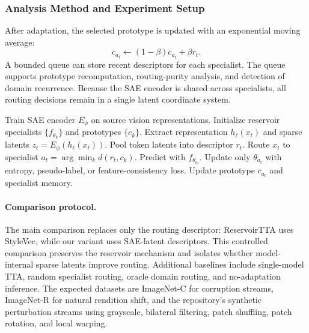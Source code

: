 \documentclass{article}
\begin{document}
\subsubsection{Analysis Method and Experiment Setup}

After adaptation, the selected prototype is updated with an exponential moving average:
\begin{equation}
c_{a_t} \leftarrow (1-\beta)c_{a_t}+\beta r_t.
\end{equation}
A bounded queue can store recent descriptors for each specialist. The queue supports prototype recomputation, routing-purity analysis, and detection of domain recurrence. Because the SAE encoder is shared across specialists, all routing decisions remain in a single latent coordinate system.

\begin{algorithm}[t]
\caption{SAE-Latent Reservoir Routing}
\begin{algorithmic}[1]
\STATE Train SAE encoder $E_\phi$ on source vision representations.
\STATE Initialize reservoir specialists $\{f_{\theta_k}\}$ and prototypes $\{c_k\}$.
    \STATE Extract representation $h_\ell(x_t)$ and sparse latents $z_t=E_\phi(h_\ell(x_t))$.
    \STATE Pool token latents into descriptor $r_t$.
    \STATE Route $x_t$ to specialist $a_t=\arg\min_k d(r_t,c_k)$.
    \STATE Predict with $f_{\theta_{a_t}}$.
    \STATE Update only $\theta_{a_t}$ with entropy, pseudo-label, or feature-consistency loss.
    \STATE Update prototype $c_{a_t}$ and specialist memory.
\ENDFOR
\end{algorithmic}
\end{algorithm}

\paragraph{Comparison protocol.}

The main comparison replaces only the routing descriptor: ReservoirTTA uses StyleVec, while our variant uses SAE-latent descriptors. This controlled comparison preserves the reservoir mechanism and isolates whether model-internal sparse latents improve routing. Additional baselines include single-model TTA, random specialist routing, oracle domain routing, and no-adaptation inference. The expected datasets are ImageNet-C for corruption streams, ImageNet-R for natural rendition shift, and the repository's synthetic perturbation streams using grayscale, bilateral filtering, patch shuffling, patch rotation, and local warping.
\end{document}
